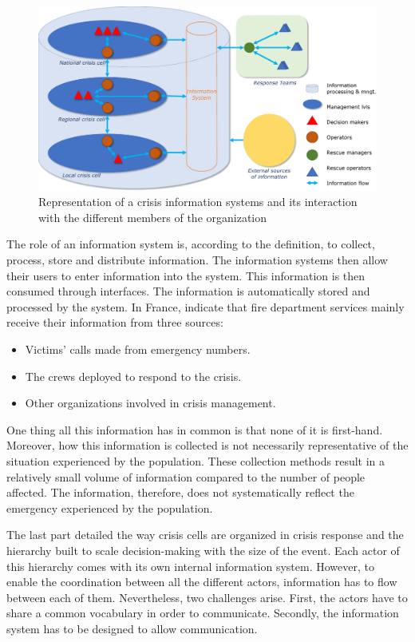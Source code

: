 \begin{figure}[htb]
    \centering
    \includegraphics[width=\textwidth]{figures/chap-1/information-system.pdf}
    \caption{Representation of a crisis information systems and its interaction with the different members of the organization}
    \label{context:information-system}
\end{figure}

The role of an information system is, according to the definition, to collect, process, store and distribute information.
The information systems then allow their users to enter information into the system.
This information is then consumed through interfaces.
The information is automatically stored and processed by the system.
In France, \textcite{morelEtudePriseDecision2010} indicate that fire department services mainly receive their information from three sources:

\begin{itemize}
    \item Victims' calls made from emergency numbers.
    \item The crews deployed to respond to the crisis.
    \item Other organizations involved in crisis management.
\end{itemize}

One thing all this information has in common is that none of it is first-hand.
Moreover, how this information is collected is not necessarily representative of the situation experienced by the population.
These collection methods result in a relatively small volume of information compared to the number of people affected.
The information, therefore, does not systematically reflect the emergency experienced by the population.

The last part detailed the way crisis cells are organized in crisis response and the hierarchy built to scale decision-making with the size of the event.
Each actor of this hierarchy comes with its own internal information system.
However, to enable the coordination between all the different actors, information has to flow between each of them.
Nevertheless, two challenges arise.
First, the actors have to share a common vocabulary in order to communicate.
Secondly, the information system has to be designed to allow communication.

